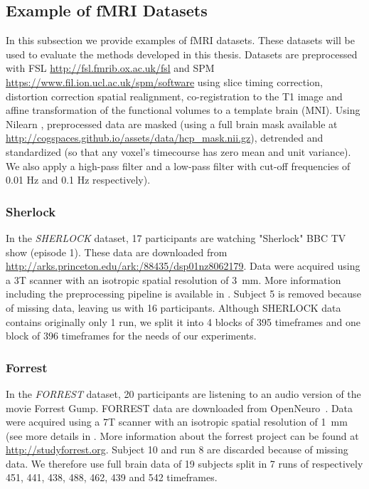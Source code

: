 \subsection{Example of fMRI Datasets}
\label{srm:datasets:fmri}
In this subsection we provide examples of fMRI datasets. These datasets will be used to evaluate the methods developed in this thesis.
Datasets are preprocessed with FSL \url{http://fsl.fmrib.ox.ac.uk/fsl}  and SPM \url{https://www.fil.ion.ucl.ac.uk/spm/software} using slice timing correction, distortion correction spatial realignment, co-registration to the T1 image and affine transformation of the functional volumes to a template brain (MNI).
Using Nilearn \cite{abraham2014machine}, preprocessed data are masked (using a full brain mask available at
\url{http://cogspaces.github.io/assets/data/hcp_mask.nii.gz}), detrended and
standardized (so that any voxel's timecourse has zero mean and unit variance).
We also apply a high-pass filter and a low-pass filter with cut-off frequencies of 0.01 Hz and 0.1 Hz respectively).

\subsubsection{Sherlock}
In the \emph{SHERLOCK} dataset, 17 participants are watching "Sherlock" BBC TV show (episode 1). 
% 
These data are downloaded from \url{http://arks.princeton.edu/ark:/88435/dsp01nz8062179}. 
% 
Data were acquired using a 3T scanner with an isotropic spatial resolution of 3~mm. 
% 
More information including the preprocessing pipeline is available in \cite{sherlock}.
% 
Subject 5 is removed because of missing data, leaving us with 16 participants.
% 
Although SHERLOCK data contains originally only 1 run, we split it into 4 blocks of 395 timeframes and one block of 396 timeframes for the needs of our experiments. 

\subsubsection{Forrest}
In the \emph{FORREST} dataset, 20 participants are listening to an audio version of the movie Forrest Gump.
% 
FORREST data are downloaded from OpenNeuro~\cite{poldrack2013toward}. 
% 
Data were acquired using a 7T scanner with an isotropic spatial resolution of 1 mm (see more details in \cite{hanke2014high}.
% 
More information about the forrest project can be found at \url{http://studyforrest.org}.
% 
Subject 10 and run 8 are discarded because of missing data.
% 
We therefore use full brain data of 19 subjects split in 7 runs of respectively 451, 441, 438, 488, 462, 439 and 542 timeframes.


